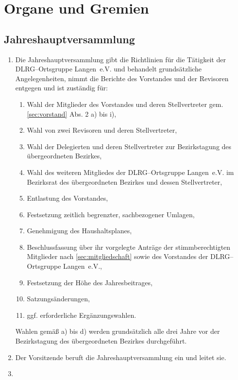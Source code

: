 \documentclass[%
12pt, %
a4paper, %
headsepline, %
parskip, %
headings=normal, %
]{scrreprt}
\begin{document}
\chapter{Organe und Gremien}
\setcounter{section}{5}
\section{Jahreshauptversammlung}
\label{sec:jahreshauptversammlung}
\begin{enumerate}
    \item Die Jahreshauptversammlung gibt die Richtlinien für die Tätigkeit der DLRG--Ortsgruppe Langen~e.V. und behandelt grundsätzliche Angelegenheiten, nimmt die Berichte des Vorstandes und der Revisoren entgegen und ist zuständig für: \begin{enumerate}[noitemsep]
        \item Wahl der Mitglieder des Vorstandes und deren Stellvertreter gem. \ref{sec:vorstand} Abs. 2 a) bis i),
        \item Wahl von zwei Revisoren und deren Stellvertreter,
        \item Wahl der Delegierten und deren Stellvertreter zur Bezirkstagung des übergeordneten Bezirkes,
        \item Wahl des weiteren Mitgliedes der DLRG--Ortsgruppe Langen~e.V. im Bezirksrat des übergeordneten Bezirkes und dessen Stellvertreter,
        \item Entlastung des Vorstandes,
        \item Festsetzung zeitlich begrenzter, sachbezogener Umlagen,
        \item Genehmigung des Haushaltsplanes,
        \item Beschlussfassung über ihr vorgelegte Anträge der stimmberechtigten Mitglieder nach \ref{sec:mitgliedschaft} sowie des Vorstandes der DLRG--Ortsgruppe Langen~e.V.,
        \item Festsetzung der Höhe des Jahresbeitrages,
        \item Satzungsänderungen,
        \item ggf. erforderliche Ergänzungswahlen.
    \end{enumerate}
    Wahlen gemäß a) bis d) werden grundsätzlich alle drei Jahre vor der Bezirkstagung des übergeordneten Bezirkes durchgeführt.
    \item Der Vorsitzende beruft die Jahreshauptversammlung ein und leitet sie.
    \item \begin{enumerate}[noitemsep]

\end{enumerate}
\end{enumerate}
\end{document}
